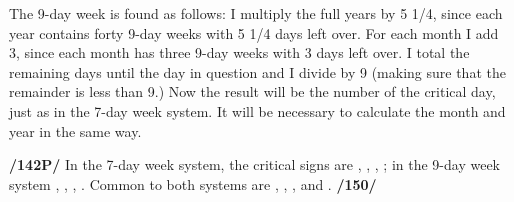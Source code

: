 The 9-day week is found as follows: I multiply the full years by 5 1/4, since each year contains forty 9-day weeks with 5 1/4 days left over. For each month I add 3, since each month has three 9-day weeks with 3 days left over. I total the remaining days until the day in question and I divide by 9 (making sure that the remainder is less than 9.) Now the result will be the number of the critical day, just as in the 7-day week system. It will be necessary to calculate the month and year in the same way.

\textbf{/142P/} In the 7-day week system, the critical signs are \Aries, \Libra, \Cancer, \Capricorn; in the 9-day
week system \Taurus, \Leo, \Scorpio, \Aquarius. Common to both systems are \Gemini, \Sagittarius, \Virgo, and \Pisces. \textbf{/150/}

\newpage